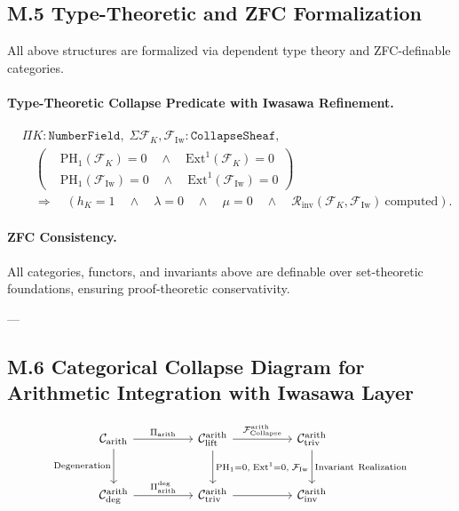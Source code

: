 \documentclass[11pt]{article}
\begin{document}
\subsection*{M.5 Type-Theoretic and ZFC Formalization}

All above structures are formalized via dependent type theory and ZFC-definable categories.

\paragraph{Type-Theoretic Collapse Predicate with Iwasawa Refinement.}
\[
\begin{aligned}
&\Pi K : \texttt{NumberField},\; 
\Sigma \mathcal{F}_K, \mathcal{F}_{\mathrm{Iw}} : \texttt{CollapseSheaf}, \\
&\quad
\left(
\begin{aligned}
& \mathrm{PH}_1(\mathcal{F}_K) = 0 \quad \wedge \quad \mathrm{Ext}^1(\mathcal{F}_K) = 0 \\
& \mathrm{PH}_1(\mathcal{F}_{\mathrm{Iw}}) = 0 \quad \wedge \quad \mathrm{Ext}^1(\mathcal{F}_{\mathrm{Iw}}) = 0
\end{aligned}
\right)
\\
&\quad \Rightarrow\quad
\left(
h_K = 1 \quad \wedge \quad
\lambda = 0 \quad \wedge \quad
\mu = 0 \quad \wedge \quad
\mathcal{R}_{\mathrm{inv}}(\mathcal{F}_K,\mathcal{F}_{\mathrm{Iw}})\ \text{computed}
\right).
\end{aligned}
\]


\paragraph{ZFC Consistency.}
All categories, functors, and invariants above are definable over set-theoretic foundations, ensuring proof-theoretic conservativity.

---

\subsection*{M.6 Categorical Collapse Diagram for Arithmetic Integration with Iwasawa Layer}

\[
\begin{tikzcd}[column sep=huge, row sep=large]
\mathcal{C}_{\mathrm{arith}} \arrow[r, "{\Pi_{\mathrm{arith}}}"] \arrow[d, "{\mathrm{Degeneration}}"']
& \mathcal{C}_{\mathrm{lift}}^{\mathrm{arith}} \arrow[r, "{\mathcal{F}_{\mathrm{Collapse}}^{\mathrm{arith}}}"] \arrow[d, "{\mathrm{PH}_1 = 0,\; \mathrm{Ext}^1 = 0,\; \mathcal{F}_{\mathrm{Iw}}}"]
& \mathcal{C}_{\mathrm{triv}}^{\mathrm{arith}} \arrow[d, "{\mathrm{Invariant\ Realization}}"] \\
\mathcal{C}_{\mathrm{deg}}^{\mathrm{arith}} \arrow[r, "{\Pi_{\mathrm{arith}}^{\mathrm{deg}}}"]
& \mathcal{C}_{\mathrm{triv}}^{\mathrm{arith}} \arrow[r]
& \mathcal{C}_{\mathrm{inv}}^{\mathrm{arith}}
\end{tikzcd}
\]
\end{document}
